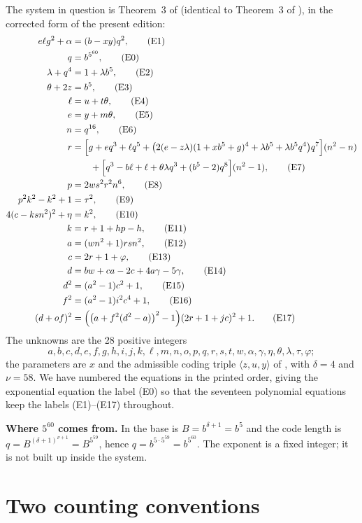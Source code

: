 \documentclass[11pt,letterpaper]{article}
\theoremstyle{definition}
\theoremstyle{remark}
\numberwithin{equation}{section}
\begin{document}
The system in question is Theorem~3 of \cite{J80} (identical to Theorem~3 of
\cite{J82}), in the corrected form of the present edition:
\begin{align}
 e\ell g^2+\alpha&=(b-xy)q^2, \tag{E1}\\
 q&=b^{5^{60}}, \tag{E0}\\
 \lambda+q^4&=1+\lambda b^5, \tag{E2}\\
 \theta+2z&=b^5, \tag{E3}\\
 \ell&=u+t\theta, \tag{E4}\\
 e&=y+m\theta, \tag{E5}\\
 n&=q^{16}, \tag{E6}\\
 r&=\Bigl[g+eq^3+\ell q^5+\bigl(2(e-z\lambda)(1+xb^5+g)^4
     +\lambda b^5+\lambda b^5q^4\bigr)q^7\Bigr](n^2-n) \notag\\
  &\qquad+\Bigl[q^3-b\ell+\ell+\theta\lambda q^3+(b^5-2)q^8\Bigr](n^2-1), \tag{E7}\\
 p&=2ws^2r^2n^6, \tag{E8}\\
 p^2k^2-k^2+1&=\tau^2, \tag{E9}\\
 4(c-ksn^2)^2+\eta&=k^2, \tag{E10}\\
 k&=r+1+hp-h, \tag{E11}\\
 a&=(wn^2+1)rsn^2, \tag{E12}\\
 c&=2r+1+\varphi, \tag{E13}\\
 d&=bw+ca-2c+4a\gamma-5\gamma, \tag{E14}\\
 d^2&=(a^2-1)c^2+1, \tag{E15}\\
 f^2&=(a^2-1)i^2c^4+1, \tag{E16}\\
 (d+of)^2&=\Bigl(\bigl(a+f^2(d^2-a)\bigr)^2-1\Bigr)(2r+1+jc)^2+1. \tag{E17}
\end{align}
The unknowns are the 28 positive integers
\[
 a,b,c,d,e,f,g,h,i,j,k,\ell,m,n,o,p,q,r,s,t,w,\alpha,\gamma,\eta,\theta,\lambda,\tau,\varphi;
\]
the parameters are $x$ and the admissible coding triple $\langle z,u,y\rangle$
of \cite[(4.1)]{J82}, with $\delta=4$ and $\nu=58$. We have numbered the
equations in the printed order, giving the exponential equation the label
(E0) so that the seventeen polynomial equations keep the labels (E1)--(E17)
throughout.

\medskip\noindent\textbf{Where $5^{60}$ comes from.} In \cite[\S4]{J82} the
base is $B=b^{\delta+1}=b^5$ and the code length is
$q=B^{(\delta+1)^{\nu+1}}=B^{5^{59}}$, hence $q=b^{5\cdot5^{59}}=b^{5^{60}}$.
The exponent is a fixed integer; it is not built up inside the system.

\section{Two counting conventions}
\end{document}
